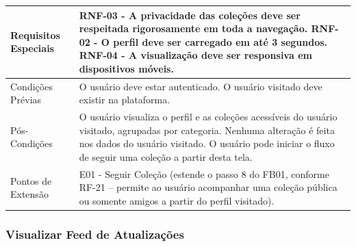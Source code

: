 \begin{longtable}{ >{\raggedright}p{2.8cm} | >{\raggedright\arraybackslash}p{10.7cm} }
Requisitos Especiais & RNF-03 - A privacidade das coleções deve ser respeitada rigorosamente em toda a navegação. RNF-02 - O perfil deve ser carregado em até 3 segundos. RNF-04 - A visualização deve ser responsiva em dispositivos móveis. \\ \hline

Condições Prévias & O usuário deve estar autenticado. O usuário visitado deve existir na plataforma. \\ \hline

Pós-Condições & O usuário visualiza o perfil e as coleções acessíveis do usuário visitado, agrupadas por categoria. Nenhuma alteração é feita nos dados do usuário visitado. O usuário pode iniciar o fluxo de seguir uma coleção a partir desta tela. \\ \hline

Pontos de Extensão & E01 - Seguir Coleção (estende o passo 8 do FB01, conforme RF-21 -- permite ao usuário acompanhar uma coleção pública ou somente amigos a partir do perfil visitado). \\
\end{longtable}
\renewcommand{\arraystretch}{1}
\FloatBarrier




\subsubsection{Visualizar Feed de Atualizações}

